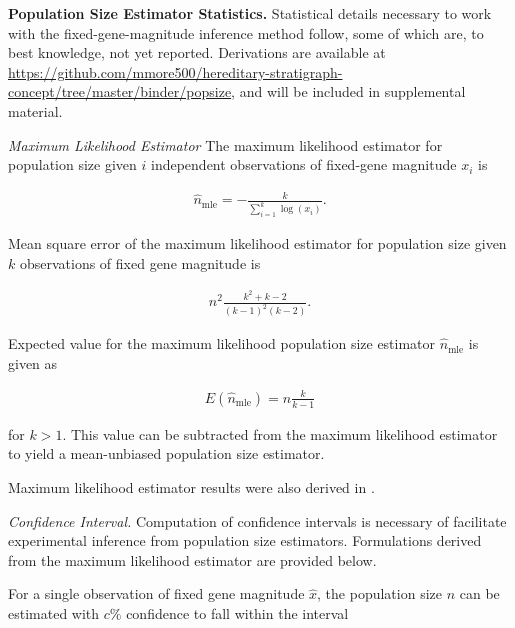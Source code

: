 \textbf{Population Size Estimator Statistics.}
Statistical details necessary to work with the fixed-gene-magnitude inference method follow, some of which are, to best knowledge, not yet reported.
Derivations are available at \url{https://github.com/mmore500/hereditary-stratigraph-concept/tree/master/binder/popsize}, and will be included in supplemental material.

\textit{Maximum Likelihood Estimator}
The maximum likelihood estimator for population size given $i$ independent observations of fixed-gene magnitude $x_i$ is
\begin{footnotesize}
\begin{align} \label{eqn:popsize_mle}
\hat{n}_\mathrm{mle} = -\frac{k}{\sum_{i=1}^k \log( x_i )}.
\end{align}
\end{footnotesize}

Mean square error of the maximum likelihood estimator for population size given $k$ observations of fixed gene magnitude is

\begin{footnotesize}
\begin{align*}
n^2 \frac{k^{2}+ k-2}{(k-1)^{2}(k-2)}.
\end{align*}
\end{footnotesize}

Expected value for the maximum likelihood population size estimator $\hat{n}_\mathrm{mle}$ is given as

\begin{footnotesize}
\begin{align*}
E(\hat{n}_\mathrm{mle})
= n\frac{k}{k-1}
\end{align*}
\end{footnotesize}

for $k>1$.
This value can be subtracted from the maximum likelihood estimator to yield a mean-unbiased population size estimator.

Maximum likelihood estimator results were also derived in \citep{varagnolo2010distributed}.

\textit{Confidence Interval.}
Computation of confidence intervals is necessary of facilitate experimental inference from population size estimators.
Formulations derived from the maximum likelihood estimator are provided below.

For a single observation of fixed gene magnitude $\hat{x}$, the population size $n$ can be estimated with $c\%$ confidence to fall within the interval

